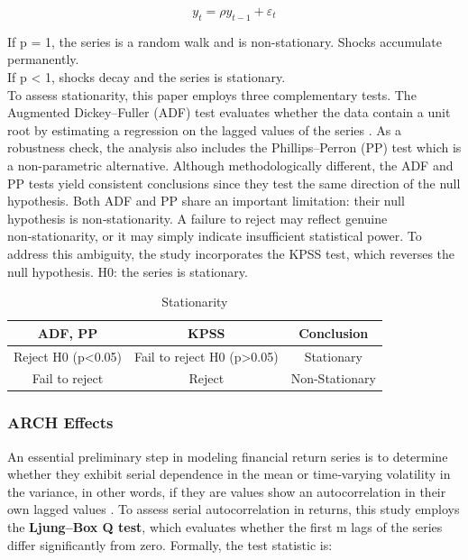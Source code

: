 \documentclass[12pt,a4paper,titlepage,oneside,english]{article}
\begin{document}
$$y_t = \rho y_{t-1} + \varepsilon_t$$

If p = 1, the series is a random walk and is non-stationary. Shocks accumulate permanently.\\
If p < 1, shocks decay and the series is stationary. \parencite{Ruey2013}\\
To assess stationarity, this paper employs three complementary tests. The Augmented Dickey–Fuller (ADF) test evaluates whether the data contain a unit root by estimating a regression on the lagged values of the series \parencite{Ruey2013}. As a robustness check, the analysis also includes the Phillips–Perron (PP) test which is a non-parametric alternative. Although methodologically different, the ADF and PP tests yield consistent conclusions since they test the same direction of the null hypothesis. Both ADF and PP share an important limitation: their null hypothesis is non‑stationarity. A failure to reject may reflect genuine non‑stationarity, or it may simply indicate insufficient statistical power.
To address this ambiguity, the study incorporates the KPSS test, which reverses the null hypothesis. H0: the series is stationary.\\

\begin{table}[H]
    \centering
    \begin{tabular}{ccc}
    \toprule
        ADF, PP  & KPSS & Conclusion\\
    \midrule
        Reject H0 (p<0.05) & Fail to reject H0 (p>0.05) & Stationary\\
        Fail to reject & Reject & Non-Stationary\\
    \bottomrule
    \end{tabular}
    \caption{Stationarity}
    \label{tab:placeholder}
\end{table}

\subsubsection{ARCH Effects}
An essential preliminary step in modeling financial return series is to determine whether they exhibit serial dependence in the mean or time‑varying volatility in the variance, in other words, if they are values show an autocorrelation in their own lagged values \parencite{Ruey2013}. To assess serial autocorrelation in returns, this study employs the \textbf{Ljung–Box Q test}, which evaluates whether the first m lags of the series differ significantly from zero. Formally, the test statistic is:
\end{document}
